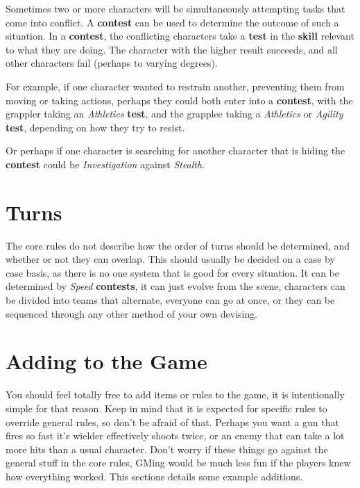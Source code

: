 \documentclass[11pt]{article}
\begin{document}
\begin{multicols}{3}
  Sometimes two or more characters will be simultaneously attempting tasks that come into conflict. A \textbf{contest} can be used to determine the outcome of such a situation. In a \textbf{contest}, the conflicting characters take a \textbf{test} in the \textbf{skill} relevant to what they are doing. The character with the higher result succeeds, and all other characters fail (perhaps to varying degrees).

  For example, if one character wanted to restrain another, preventing them from moving or taking actions, perhaps they could both enter into a \textbf{contest}, with the grappler taking an \textit{Athletics} \textbf{test}, and the grapplee taking a \textit{Athletics} or \textit{Agility} \textbf{test}, depending on how they try to resist.

  Or perhaps if one character is searching for another character that is hiding the \textbf{contest} could be \textit{Investigation} against \textit{Stealth}.

  \section*{Turns}

  The core rules do not describe how the order of turns should be determined, and whether or not they can overlap. This should usually be decided on a case by case basis, as there is no one system that is good for every situation. It can be determined by \textit{​Speed} \textbf{contests}, it can just evolve from the scene, characters can be divided into teams that alternate, everyone can go at once, or they can be sequenced through any other method of your own devising.

  \section*{Adding to the Game}

  You should feel totally free to add items or rules to the game, it is intentionally simple for that reason. Keep in mind that it is expected for specific rules to override general rules, so don't be afraid of that. Perhaps you want a gun that fires so fast it's wielder effectively shoots twice, or an enemy that can take a lot more hits than a usual character. Don't worry if these things go against the general stuff in the core rules, GMing would be much less fun if the players knew how everything worked. This sections details some example additions.


\end{multicols}
\end{document}
